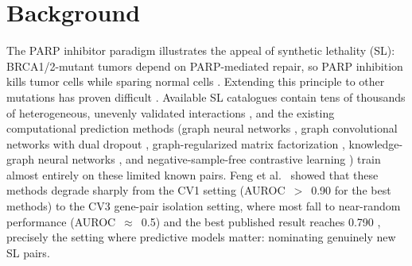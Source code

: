 \documentclass[11pt,a4paper]{article}
\begin{document}
\begin{abstract}
\textbf{Keywords:} Synthetic lethality, paralog compensation, DepMap, CPTAC proteomics, Delta Dependency, dependency window
\end{abstract}


\section*{Background}

The PARP inhibitor paradigm illustrates the appeal of synthetic lethality (SL): BRCA1/2-mutant tumors depend on PARP-mediated repair, so PARP inhibition kills tumor cells while sparing normal cells \cite{ONeil2017,Huang2020,Lord2017,Bryant2005,Farmer2005}. Extending this principle to other mutations has proven difficult \cite{Goncalves2026}. Available SL catalogues contain tens of thousands of heterogeneous, unevenly validated interactions \cite{Guo2016,SynLethDB2022}, and the existing computational prediction methods (graph neural networks \cite{Zhu2023,Long2021}, graph convolutional networks with dual dropout \cite{Cai2020}, graph-regularized matrix factorization \cite{Huang2019}, knowledge-graph neural networks \cite{Wang2021}, and negative-sample-free contrastive learning \cite{Wang2022}) train almost entirely on these limited known pairs. Feng et al.\ \cite{Feng2024} showed that these methods degrade sharply from the CV1 setting (AUROC~$>$~0.90 for the best methods) to the CV3 gene-pair isolation setting, where most fall to near-random performance (AUROC~$\approx$~0.5) and the best published result reaches 0.790 \cite{Hao2021}, precisely the setting where predictive models matter: nominating genuinely new SL pairs.
\end{document}
